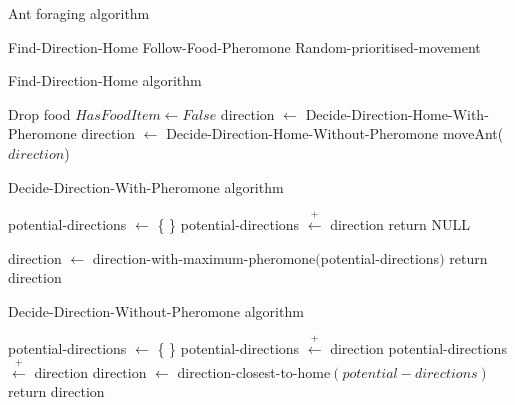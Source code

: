 \documentclass[a4paper, oneside, 11pt]{report}
\begin{document}
\begin{algorithm}[th]
\caption{ Ant foraging algorithm } \label{Algorithm:General}
\begin{algorithmic}[1] 
		\State Find-Direction-Home
		\State Follow-Food-Pheromone
	\Else
		\State Random-prioritised-movement
	\EndIf
\end{algorithmic}
\end{algorithm}

\begin{algorithm}[th]
	\caption{ Find-Direction-Home algorithm}  \label{Algorithm:Find_Home}
	\begin{algorithmic}[1]
			\State Drop food 
			\State $HasFoodItem \gets False$
		\Else
			\State direction $\leftarrow$ Decide-Direction-Home-With-Pheromone
				\State direction $\leftarrow$ Decide-Direction-Home-Without-Pheromone
			\EndIf
		\EndIf
		\State moveAnt($direction$)
	\end{algorithmic}
\end{algorithm}

\begin{algorithm}[th]
	\caption{ Decide-Direction-With-Pheromone algorithm}  \label{Algorithm:Home_Pheromone}
	\begin{algorithmic}[1]
		\State potential-directions $\leftarrow$ \{ \}
						\State potential-directions $\overset{+}{\leftarrow}$ direction
					\EndIf
				\EndIf
			\EndIf
		\EndWhile
			\State return NULL
		
		\Else
			\State direction $\leftarrow$ direction-with-maximum-pheromone$($potential-directions$)$
			\State return direction
		\EndIf
	\end{algorithmic}
\end{algorithm}

\begin{algorithm}[th]
	\caption{ Decide-Direction-Without-Pheromone algorithm}
	 \label{Algorithm:Home_Distance}
	\begin{algorithmic}[1]
		\State potential-directions $\leftarrow$ \{ \}
				\State potential-directions $\overset{+}{\leftarrow}$ direction
				\State potential-directions $\overset{+}{\leftarrow}$ direction
			\EndIf
		\EndIf
		\EndWhile
		\State direction $\leftarrow$ direction-closest-to-home$(potential-directions)$
		\State return direction
	\end{algorithmic}
\end{algorithm}
\end{document}
